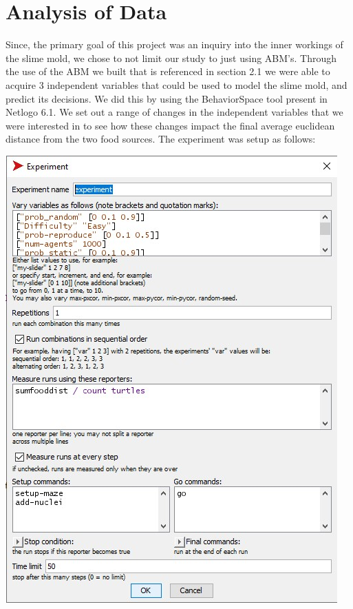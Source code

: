 \documentclass[a4paper, 12pt]{article}
\begin{document}
\section{Analysis of Data}
Since, the primary goal of this project was an inquiry into the inner workings of the slime mold, we chose to not limit our study to just using ABM's. Through the use of the ABM we built that is referenced in section 2.1 we were able to acquire 3 independent variables that could be used to model the slime mold, and predict its decisions. We did this by using the BehaviorSpace tool present in Netlogo 6.1. We set out a range of changes in the independent variables that we were interested in to see how these changes impact the final average euclidean distance from the two food sources. The experiment was setup as follows: 
\begin{center}
    \includegraphics[scale=0.9]{Images/behaviorspace.jpg}
\end{center}
\newpage
\end{document}
